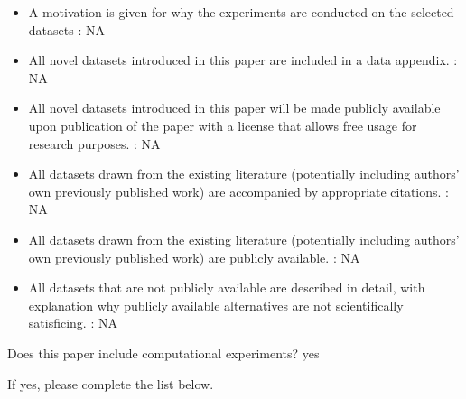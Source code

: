 \begin{itemize}
\item A motivation is given for why the experiments are conducted on the selected datasets : NA %
\item All novel datasets introduced in this paper are included in a data appendix. : NA %
\item All novel datasets introduced in this paper will be made publicly available upon publication of the paper with a license that allows free usage for research purposes. : NA %
\item All datasets drawn from the existing literature (potentially including authors’ own previously published work) are accompanied by appropriate citations. : NA %
\item All datasets drawn from the existing literature (potentially including authors’ own previously published work) are publicly available. : NA %
\item All datasets that are not publicly available are described in detail, with explanation why publicly available alternatives are not scientifically satisficing. : NA%
\end{itemize}


\noindent Does this paper include computational experiments? yes %

\noindent If yes, please complete the list below.


